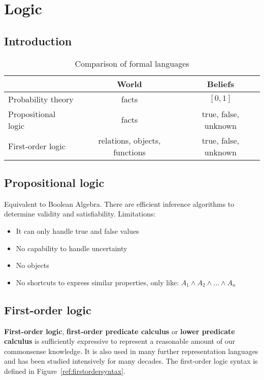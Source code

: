 \documentclass{report}
\begin{document}
\chapter{Logic}
\section{Introduction}

\begin{table}[h!]
\begin{center}
\begin{tabular}{l||c|c}
& World & Beliefs \\
\hline
\hline
Probability theory & facts & $[0,1]$ \\
\hline
Propositional logic & facts & true, false, unknown \\
\hline
First-order logic & relations, objects, functions & true, false, unknown \\
\end{tabular}
\end{center}
\caption{Comparison of formal languages}
\label{ref:complang}
\end{table}


\section{Propositional logic}
Equivalent to Boolean Algebra. There are efficient inference algorithms to determine validity and satisfiability. Limitations:
\begin{itemize}
  \item It can only handle true and false values
  \item No capability to handle uncertainty
  \item No objects
  \item No shortcuts to express similar properties, only like: $A_1 \wedge A_2 \wedge ... \wedge A_n$
\end{itemize}


\section{First-order logic}
{\bf First-order logic}, {\bf first-order predicate calculus} or {\bf lower predicate calculus} is sufficiently expressive to represent a reasonable amount of our commonsense knowledge.
It is also used in many further representation languages and has been studied intensively for many decades. The first-order logic syntax is defined in Figure~\ref{ref:firstordersyntax}.
\end{document}

